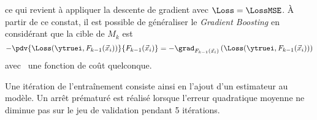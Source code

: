 ce qui revient à appliquer la descente de gradient avec $\Loss=\LossMSE$.
À partir de ce constat,
il est possible de généraliser le \emph{Gradient Boosting}
en considérant que la cible de $M_k$ est
\begin{equation}
- \pdv{\Loss(\ytruei, F_{k-1}(\vec{x}_i))}{F_{k-1}(\vec{x}_i)}
=
- \grad_{F_{k-1}(\vec{x}_i)} \left(\Loss(\ytruei, F_{k-1}(\vec{x}_i))\right)
\end{equation}
avec \Loss\ une fonction de coût quelconque.
\par
Une itération de l'entraînement consiste ainsi en l'ajout d'un estimateur au modèle.
Un arrêt prématuré est réalisé lorsque l'erreur quadratique moyenne ne diminue pas sur le jeu de validation pendant 5 itérations.